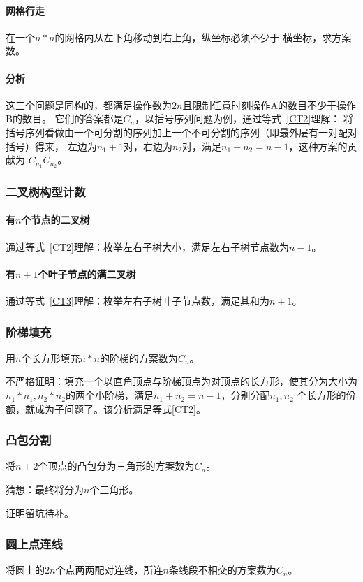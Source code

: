 \paragraph{网格行走} 在一个$n*n$的网格内从左下角移动到右上角，纵坐标必须不少于
横坐标，求方案数。
\paragraph{分析}
这三个问题是同构的，都满足操作数为$2n$且限制任意时刻操作A的数目不少于操作B的数目。
它们的答案都是$C_n$，以括号序列问题为例，通过等式~\ref{CT2}理解：
将括号序列看做由一个可分割的序列加上一个不可分割的序列（即最外层有一对配对括号）得来，
左边为$n_1+1$对，右边为$n_2$对，满足$n_1+n_2=n-1$，这种方案的贡献为
$C_{n_1}C_{n_2}$。
\subsubsection{二叉树构型计数}
\paragraph{有$n$个节点的二叉树}
通过等式~\ref{CT2}理解：枚举左右子树大小，满足左右子树节点数为$n-1$。
\paragraph{有$n+1$个叶子节点的满二叉树}
通过等式~\ref{CT3}理解：枚举左右子树叶子节点数，满足其和为$n+1$。
\subsubsection{阶梯填充}
用$n$个长方形填充$n*n$的阶梯的方案数为$C_n$。

不严格证明：填充一个以直角顶点与阶梯顶点为对顶点的长方形，使其分为大小为
$n_1*n_1,n_2*n_2$的两个小阶梯，满足$n_1+n_2=n-1$，分别分配$n_1,n_2$
个长方形的份额，就成为子问题了。该分析满足等式\ref{CT2}。
\subsubsection{凸包分割}
将$n+2$个顶点的凸包分为三角形的方案数为$C_n$。

猜想：最终将分为$n$个三角形。

证明留坑待补。
\subsubsection{圆上点连线}
将圆上的$2n$个点两两配对连线，所连$n$条线段不相交的方案数为$C_n$。

